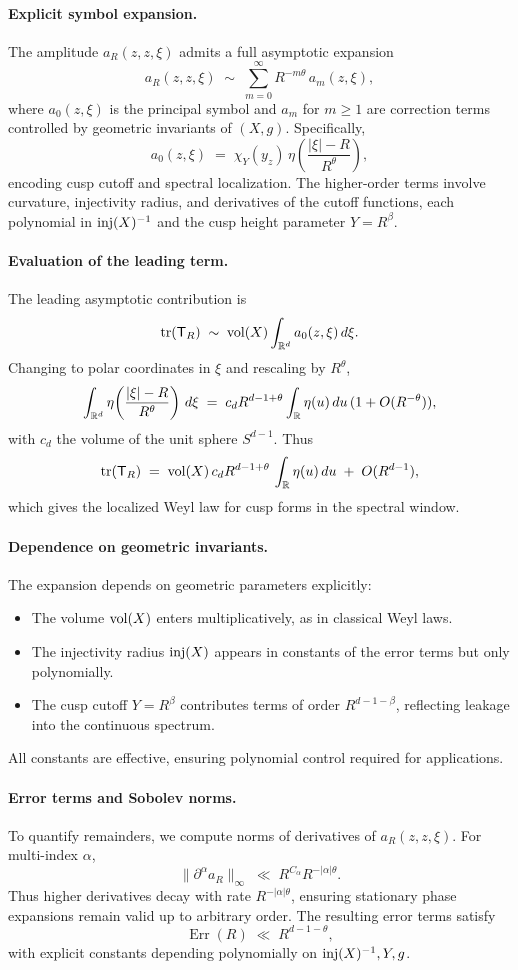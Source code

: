 \paragraph{Explicit symbol expansion.}
The amplitude $a_R(z,z,\xi)$ admits a full asymptotic expansion
\[
a_R(z,z,\xi) \;\sim\; \sum_{m=0}^\infty R^{-m\theta} \, a_m(z,\xi),
\]
where $a_0(z,\xi)$ is the principal symbol and $a_m$ for $m\ge1$ are correction terms controlled by geometric invariants of $(X,g)$. Specifically,
\[
a_0(z,\xi) \;=\; \chi_Y(y_z) \,\eta\!\left(\frac{|\xi|-R}{R^\theta}\right),
\]
encoding cusp cutoff and spectral localization. The higher-order terms involve curvature, injectivity radius, and derivatives of the cutoff functions, each polynomial in $\mathrm{inj}(X)^{-1}$ and the cusp height parameter $Y=R^\beta$.

\paragraph{Evaluation of the leading term.}
The leading asymptotic contribution is
\[
\operatorname{tr}(\mathsf{T}_R) \;\sim\; \operatorname{vol}(X) \int_{\mathbb{R}^d} a_0(z,\xi)\,d\xi.
\]
Changing to polar coordinates in $\xi$ and rescaling by $R^\theta$,
\[
\int_{\mathbb{R}^d} \eta\!\left(\frac{|\xi|-R}{R^\theta}\right)\,d\xi
\;=\; c_d R^{d-1+\theta} \int_{\mathbb{R}} \eta(u)\,du \,(1+O(R^{-\theta})),
\]
with $c_d$ the volume of the unit sphere $S^{d-1}$. Thus
\[
\operatorname{tr}(\mathsf{T}_R) \;=\; \operatorname{vol}(X)\, c_d R^{d-1+\theta}\, \int_{\mathbb{R}}\eta(u)\,du \;+\; O(R^{d-1}),
\]
which gives the localized Weyl law for cusp forms in the spectral window.

\paragraph{Dependence on geometric invariants.}
The expansion depends on geometric parameters explicitly:
\begin{itemize}
\item The volume $\operatorname{vol}(X)$ enters multiplicatively, as in classical Weyl laws.
\item The injectivity radius $\mathrm{inj}(X)$ appears in constants of the error terms but only polynomially.
\item The cusp cutoff $Y=R^\beta$ contributes terms of order $R^{d-1-\beta}$, reflecting leakage into the continuous spectrum.
\end{itemize}
All constants are effective, ensuring polynomial control required for applications.

\paragraph{Error terms and Sobolev norms.}
To quantify remainders, we compute norms of derivatives of $a_R(z,z,\xi)$. For multi-index $\alpha$,
\[
\|\partial^\alpha a_R\|_\infty \;\ll\; R^{C_\alpha} R^{-|\alpha|\theta}.
\]
Thus higher derivatives decay with rate $R^{-|\alpha|\theta}$, ensuring stationary phase expansions remain valid up to arbitrary order. The resulting error terms satisfy
\[
\operatorname{Err}(R) \;\ll\; R^{d-1-\theta},
\]
with explicit constants depending polynomially on $\mathrm{inj}(X)^{-1}, Y, g$.

